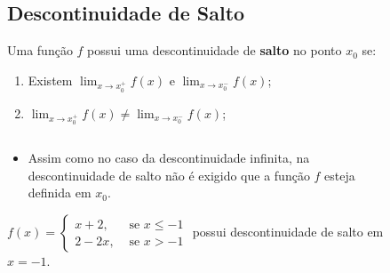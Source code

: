 \subsection{Descontinuidade de Salto}
\begin{frame}
  \begin{definition}
    Uma função $f$ possui uma descontinuidade de \textbf{salto} no ponto $x_{0}$ se:
    \begin{enumerate}
      \item Existem $\displaystyle\lim_{x\to x_{0}^{+}}{f(x)}$ e  $\displaystyle\lim_{x\to x_{0}^{-}}{f(x)}$;
      \item $\displaystyle\lim_{x\to x_{0}^{+}}{f(x)} \not= \lim_{x\to x_{0}^{-}}{f(x)}$;
    \end{enumerate}
  \end{definition}
  \begin{columns}[onlytextwidth]
    \begin{column}{0.49\textwidth}
      \begin{itemize}
        \item Assim como no caso da descontinuidade infinita, na descontinuidade de salto não é exigido que a função $f$ esteja definida em $x_{0}$.
      \end{itemize}
      \vspace*{0.1cm}
      \begin{example-highlight}
        $\displaystyle f(x) = \begin{cases}
          x+2,&\mbox{ se }x\leq -1 \\ 2-2x,&\mbox{ se }x > -1
        \end{cases}$ possui descontinuidade de salto em $x=-1$.
      \end{example-highlight}
    \end{column}
    \begin{column}{0.49\textwidth}\vspace{-0.5cm}
      \begin{figure}
      \end{figure}
    \end{column}
  \end{columns}
\end{frame}

